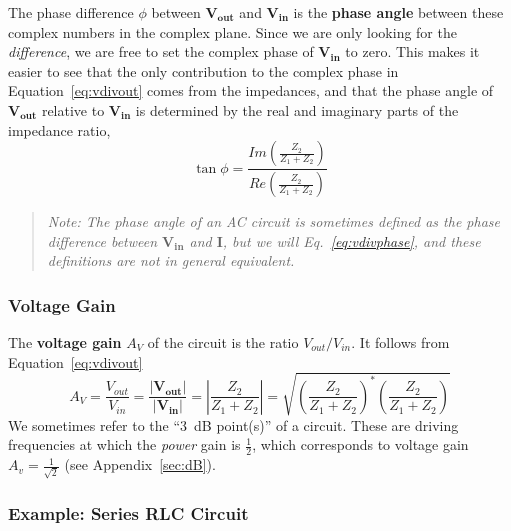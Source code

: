 \documentclass[11pt]{article}
\begin{document}
The phase difference $\phi$ between $\mathbf{V_{out}}$ and
$\mathbf{V_{in}}$ is the \textbf{phase angle} between these complex
numbers in the complex plane. Since we are only looking for the 
\emph{difference}, we are free to set the complex phase of $\mathbf{V_{in}}$
to zero. This makes it easier to see that the only contribution to the
complex phase in Equation~\ref{eq:vdivout} comes from the impedances,
and that the phase angle of $\mathbf{V_{out}}$ relative to
$\mathbf{V_{in}}$ is determined by the real and imaginary parts of the
impedance ratio,
\begin{equation}
  \tan \phi = \frac{ Im \left( \frac{Z_2}{Z_1 + Z_2} \right) }
                   { Re \left( \frac{Z_2}{Z_1 + Z_2} \right) }
  \label{eq:vdivphase}
\end{equation}

\begin{quote}
  \textit{Note: The phase angle of an AC circuit is sometimes defined
    as the phase difference between $\mathbf{V_{in}}$ and
    $\mathbf{I}$, but we will Eq.~\ref{eq:vdivphase}, and these
    definitions are not in general equivalent.}
\end{quote}

\subsubsection*{Voltage Gain}

The \textbf{voltage gain} $A_V$ of the circuit is the ratio
$V_{out}/V_{in}$. It follows from Equation~\ref{eq:vdivout}
\begin{equation}
  A_V = \frac{V_{out}}{V_{in}} = \frac{|\mathbf{V_{out}}|}{|\mathbf{V_{in}}|}
                             = \left| \frac{Z_2}{Z_1 + Z_2} \right|
                             = \sqrt{ \left( \frac{Z_2}{Z_1 + Z_2} \right)^*
                                      \left( \frac{Z_2}{Z_1 + Z_2} \right) }
  \label{eq:gain}
\end{equation}
We sometimes refer to the ``3~dB point(s)'' of a circuit. These are
driving frequencies at which the \textit{power} gain is $\frac{1}{2}$,
which corresponds to voltage gain $A_v = \frac{1}{\sqrt{2}}$ (see
Appendix~\ref{sec:dB}).

\subsubsection*{Example: Series RLC Circuit}
\end{document}
